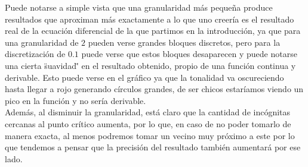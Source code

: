 Puede notarse a simple vista que una granularidad más pequeña produce resultados que aproximan más exactamente a lo que uno creería es el resultado real de la ecuación diferencial de la que partimos en la introducción, ya que para una granularidad de $2$ pueden verse grandes bloques discretos, pero para la discretización de $0.1$ puede verse que estos bloques desaparecen y puede notarse una cierta \"suavidad\"' en el resultado obtenido, propio de una función continua y derivable. Esto puede verse en el gráfico ya que la tonalidad va oscureciendo hasta llegar a rojo generando círculos grandes, de ser chicos estaríamos viendo un pico en la función y no sería derivable.
\\
Además, al disminuir la granularidad, está claro que la cantidad de incógnitas cercanas al punto crítico aumenta, por lo que, en caso de no poder tomarlo de manera exacta, al menos podremos tomar un vecino muy próximo a este por lo que tendemos a pensar que la precisión del resultado también aumentará por ese lado.
